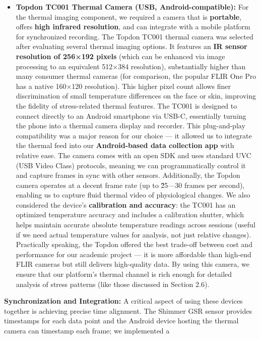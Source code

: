 \begin{itemize}
\item \textbf{Topdon TC001 Thermal Camera (USB, Android-compatible):} For the
  thermal imaging component, we required a camera that is \textbf{portable},
  offers \textbf{high infrared resolution}, and can integrate with a mobile
  platform for synchronized recording. The Topdon TC001 thermal camera
  was selected after evaluating several thermal imaging options. It
  features an \textbf{IR sensor resolution of 256×192 pixels} (which can be
  enhanced via image processing to an equivalent 512×384
  resolution)\cite{TopdonTC001},
  substantially higher than many consumer thermal cameras (for
  comparison, the popular FLIR One Pro has a native 160×120 resolution).
  This higher pixel count allows finer discrimination of small
  temperature differences on the face or skin, improving the fidelity of
  stress-related thermal features. The TC001 is designed to connect
  directly to an Android smartphone via USB-C, essentially turning the
  phone into a thermal camera display and recorder. This plug-and-play
  compatibility was a major reason for our choice --- it allowed us to
  integrate the thermal feed into our \textbf{Android-based data collection
  app} with relative ease. The camera comes with an open SDK and uses
  standard UVC (USB Video Class) protocols, meaning we can
  programmatically control it and capture frames in sync with other
  sensors. Additionally, the Topdon camera operates at a decent frame
  rate (up to \~25---30 frames per second), enabling us to capture fluid
  thermal video of physiological changes. We also considered the
  device's \textbf{calibration and accuracy}: the TC001 has an optimized
  temperature accuracy and includes a calibration shutter, which helps
  maintain accurate absolute temperature readings across sessions
  (useful if we need actual temperature values for analysis, not just
  relative changes). Practically speaking, the Topdon offered the best
  trade-off between cost and performance for our academic project --- it
  is more affordable than high-end FLIR cameras but still delivers
  high-quality data. By using this camera, we ensure that our platform's
  thermal channel is rich enough for detailed analysis of stress
  patterns (like those discussed in Section 2.6).

\end{itemize}
\textbf{Synchronization and Integration:} A critical aspect of using these
devices together is achieving precise time alignment. The Shimmer GSR
sensor provides timestamps for each data point and the Android device
hosting the thermal camera can timestamp each frame; we implemented a

